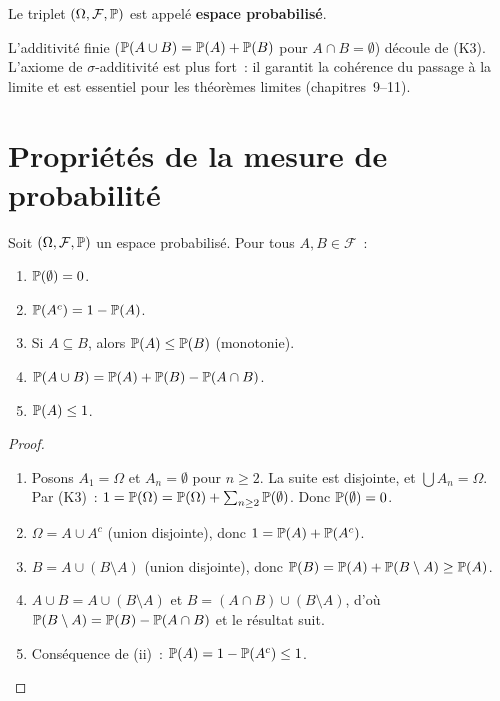 \begin{definition}
Le triplet $(\Omega, \mathcal{F}, \mathbb{P})$ est appel\'e \textbf{espace probabilis\'e}.
\end{definition}

\begin{attention}[title=\textbf{Additivit\'e finie vs.\ $\sigma$-additivit\'e}]
L'additivit\'e finie ($\mathbb{P}(A \cup B) = \mathbb{P}(A) + \mathbb{P}(B)$ pour $A \cap B = \emptyset$)
d\'ecoule de (K3). L'axiome de $\sigma$-additivit\'e est plus fort~: il garantit la
coh\'erence du passage \`a la limite et est essentiel pour les th\'eor\`emes limites
(chapitres~9--11).
\end{attention}

\section{Propri\'et\'es de la mesure de probabilit\'e}

\begin{theoreme}
\label{thm:prop_proba}
Soit $(\Omega, \mathcal{F}, \mathbb{P})$ un espace probabilis\'e. Pour tous
$A, B \in \mathcal{F}$~:
\begin{enumerate}[label=(\roman*)]
    \item $\mathbb{P}(\emptyset) = 0$.
    \item $\mathbb{P}(A^c) = 1 - \mathbb{P}(A)$.
    \item Si $A \subseteq B$, alors $\mathbb{P}(A) \leq \mathbb{P}(B)$ \quad (monotonie).
    \item $\mathbb{P}(A \cup B) = \mathbb{P}(A) + \mathbb{P}(B) - \mathbb{P}(A \cap B)$.
    \item $\mathbb{P}(A) \leq 1$.
\end{enumerate}
\end{theoreme}

\begin{proof}
\begin{enumerate}[label=(\roman*)]
    \item Posons $A_1 = \Omega$ et $A_n = \emptyset$ pour $n \geq 2$. La suite est
    disjointe, et $\bigcup A_n = \Omega$. Par (K3)~:
    $1 = \mathbb{P}(\Omega) = \mathbb{P}(\Omega) + \sum_{n \geq 2} \mathbb{P}(\emptyset)$.
    Donc $\mathbb{P}(\emptyset) = 0$.

    \item $\Omega = A \cup A^c$ (union disjointe), donc
    $1 = \mathbb{P}(A) + \mathbb{P}(A^c)$.

    \item $B = A \cup (B \setminus A)$ (union disjointe), donc
    $\mathbb{P}(B) = \mathbb{P}(A) + \mathbb{P}(B \setminus A) \geq \mathbb{P}(A)$.

    \item $A \cup B = A \cup (B \setminus A)$ et
    $B = (A \cap B) \cup (B \setminus A)$, d'o\`u
    $\mathbb{P}(B \setminus A) = \mathbb{P}(B) - \mathbb{P}(A \cap B)$ et le r\'esultat suit.

    \item Cons\'equence de (ii)~: $\mathbb{P}(A) = 1 - \mathbb{P}(A^c) \leq 1$.
\end{enumerate}
\end{proof}

